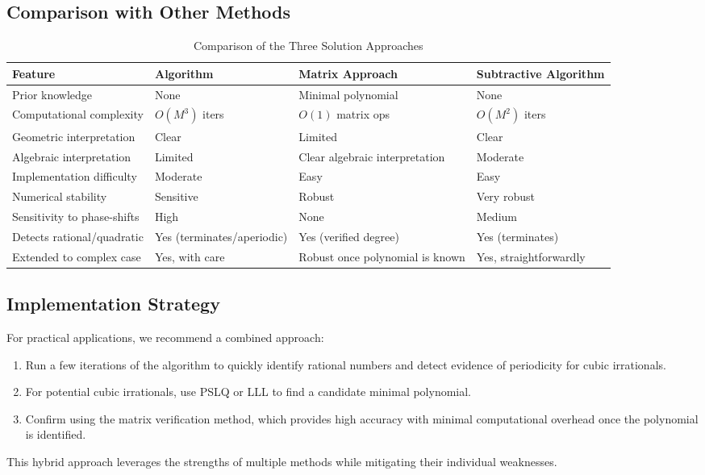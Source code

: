 \subsection{Comparison with Other Methods}

\begin{table}[htbp]
\centering
\begin{tabularx}{\textwidth}{lXXX} %
\textbf{Feature} & \textbf{\HAPD{} Algorithm} & \textbf{Matrix Approach} & \textbf{Subtractive Algorithm} \\
\hline
Prior knowledge & None & Minimal polynomial & None \\
\hline
Computational complexity & $O(M^3)$ iters & $O(1)$ matrix ops & $O(M^2)$ iters \\
\hline
Geometric interpretation & Clear & Limited & Clear \\
\hline
Algebraic interpretation & Limited & Clear algebraic interpretation & Moderate \\
\hline
Implementation difficulty & Moderate & Easy & Easy \\
\hline
Numerical stability & Sensitive & Robust & Very robust \\
\hline
Sensitivity to phase-shifts & High & None & Medium \\
\hline
Detects rational/quadratic & Yes (terminates/aperiodic) & Yes (verified degree) & Yes (terminates) \\
\hline
Extended to complex case & Yes, with care & Robust once polynomial is known & Yes, straightforwardly \\
\hline
\end{tabularx} %
\caption{Comparison of the Three Solution Approaches}
\label{tab:verification_comparison}
\end{table}

\subsection{Implementation Strategy}

For practical applications, we recommend a combined approach:
\begin{enumerate}
    \item Run a few iterations of the \HAPD{} algorithm to quickly identify rational numbers and detect evidence of periodicity for cubic irrationals.
    \item For potential cubic irrationals, use PSLQ or LLL to find a candidate minimal polynomial.
    \item Confirm using the matrix verification method, which provides high accuracy with minimal computational overhead once the polynomial is identified.
\end{enumerate}

This hybrid approach leverages the strengths of multiple methods while mitigating their individual weaknesses.
